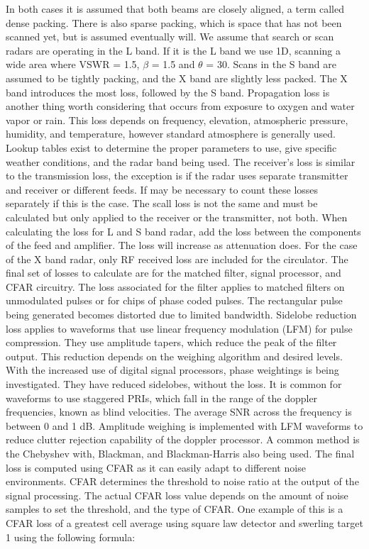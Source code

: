 \documentclass[12pt]{article}
\begin{document}
In both cases it is assumed that both beams are closely aligned, a term called dense packing. There is also sparse packing, which is space that has not been scanned yet, but is assumed eventually will. We assume that search or scan radars are operating in the L band. If it is the L band we use 1D, scanning a wide area where VSWR = 1.5, $\beta$ = 1.5 and $\theta$ = 30. Scans in the S band are assumed to be tightly packing, and the X band are slightly less packed. The X band introduces the most loss, followed by the S band.
Propagation loss is another thing worth considering that occurs from exposure to oxygen and water vapor or rain. This loss depends on frequency, elevation, atmospheric pressure, humidity, and temperature, however standard atmosphere is generally used. Lookup tables exist to determine the proper parameters to use, give specific weather conditions, and the radar band being used.
The receiver's loss is similar to the transmission loss, the exception is if the radar uses separate transmitter and receiver or different feeds. If may be necessary to count these losses separately if this is the case. The scall loss is not the same and must be calculated but only applied to the receiver or the transmitter, not both. When calculating the loss for L and S band radar, add the loss between the components of the feed and amplifier. The loss will increase as attenuation does. For the case of the X band radar, only RF received loss are included for the circulator. The final set of losses to calculate are for the matched filter, signal processor, and CFAR circuitry. The loss associated for the filter applies to matched filters on unmodulated pulses or for chips of phase coded pulses. The rectangular pulse being generated becomes distorted due to limited bandwidth. Sidelobe reduction loss applies to waveforms that use linear frequency modulation (LFM) for pulse compression. They use amplitude tapers, which reduce the peak of the filter output. This reduction depends on the weighing algorithm and desired levels. With the increased use of digital signal processors, phase weightings is being investigated. They have reduced sidelobes, without the loss. It is common for waveforms to use staggered PRIs, which fall in the range of the doppler frequencies, known as blind velocities. The average SNR across the frequency is between 0 and 1 dB. Amplitude weighing is implemented with LFM waveforms to reduce clutter rejection capability of the doppler processor. A common method is the Chebyshev with, Blackman, and Blackman-Harris also being used. The final loss is computed using CFAR as it can easily adapt to different noise environments. CFAR determines the threshold to noise ratio at the output of the signal processing. The actual CFAR loss value depends on the amount of noise samples to set the threshold, and the type of CFAR. One example of this is a CFAR loss of a greatest cell average using square law detector and swerling target 1 using the following formula:
\end{document}
